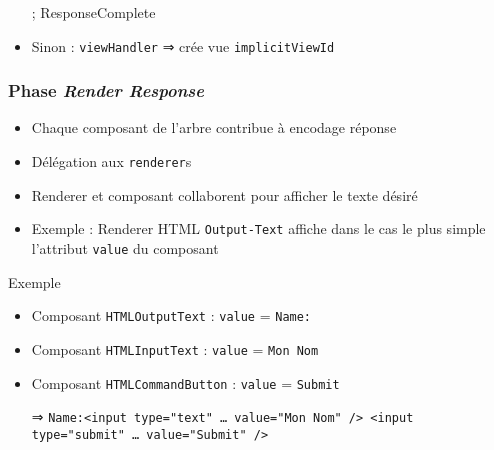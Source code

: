 \documentclass[english, french]{beamer}
\begin{document}
\begin{frame}
\begin{itemize}
{{		}} ; ResponseComplete
		\item Sinon : \texttt{viewHandler} ⇒ crée vue \texttt{implicitViewId}
	\end{itemize}
\end{frame}

\begin{frame}
	\frametitle{Phase \emph{Render Response}}
	\begin{itemize}
		\item Chaque composant de l’arbre contribue à encodage réponse
		\item Délégation aux \texttt{renderer}s
		\item Renderer et composant collaborent pour afficher le texte désiré
		\item Exemple : Renderer HTML \texttt{Output-Text} affiche {\tiny dans le cas le plus simple} l’attribut \texttt{value} du composant
	\end{itemize}
	\begin{exampleblock}{Exemple}
		\begin{itemize}
			\item Composant \texttt{HTMLOutputText} : \texttt{value} = \texttt{Name:}
			\item Composant \texttt{HTMLInputText} : \texttt{value} = \texttt{Mon Nom}
			\item Composant \texttt{HTMLCommandButton} : \texttt{value} = \texttt{Submit}
			\item[⇒] \texttt{Name:<input type="text" … value="Mon Nom" /> <input type="submit" … value="Submit" />}
		\end{itemize}
	\end{exampleblock}
\end{frame}
\end{document}
